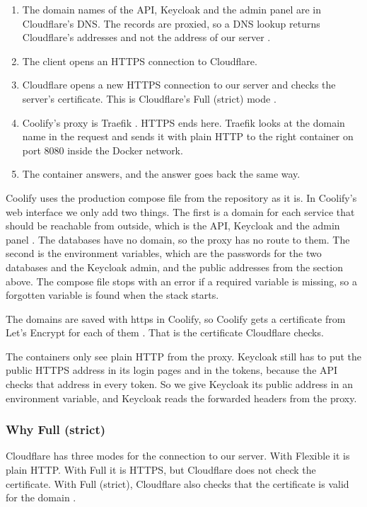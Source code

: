 \documentclass[a4paper,11pt]{article}
\begin{document}
\begin{enumerate}
    \item The domain names of the API, Keycloak and the admin panel are in Cloudflare's DNS. The records are proxied, so a DNS lookup returns Cloudflare's addresses and not the address of our server \cite{cloudflare-proxy-status}.
    \item The client opens an HTTPS connection to Cloudflare.
    \item Cloudflare opens a new HTTPS connection to our server and checks the server's certificate. This is Cloudflare's Full (strict) mode \cite{cloudflare-ssl-modes}.
    \item Coolify's proxy is Traefik \cite{coolify-traefik-overview}. HTTPS ends here. Traefik looks at the domain name in the request and sends it with plain HTTP to the right container on port 8080 inside the Docker network.
    \item The container answers, and the answer goes back the same way.
\end{enumerate}

Coolify uses the production compose file from the repository as it is. In Coolify's web interface we only add two things. The first is a domain for each service that should be reachable from outside, which is the API, Keycloak and the admin panel \cite{coolify-docker-compose}. The databases have no domain, so the proxy has no route to them. The second is the environment variables, which are the passwords for the two databases and the Keycloak admin, and the public addresses from the section above. The compose file stops with an error if a required variable is missing, so a forgotten variable is found when the stack starts.

The domains are saved with https in Coolify, so Coolify gets a certificate from Let's Encrypt for each of them \cite{coolify-traefik-overview}. That is the certificate Cloudflare checks.

The containers only see plain HTTP from the proxy. Keycloak still has to put the public HTTPS address in its login pages and in the tokens, because the API checks that address in every token. So we give Keycloak its public address in an environment variable, and Keycloak reads the forwarded headers from the proxy.

\subsubsection*{Why Full (strict)}
Cloudflare has three modes for the connection to our server. With Flexible it is plain HTTP. With Full it is HTTPS, but Cloudflare does not check the certificate. With Full (strict), Cloudflare also checks that the certificate is valid for the domain \cite{cloudflare-ssl-modes}.
\end{document}
